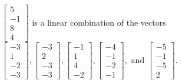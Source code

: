 \begin{exercise}
\begin{exerciseStatement}
  \end{exerciseStatement}
  \begin{exerciseAnswer}
   \(\left[\begin{array}{c}
5 \\
-1 \\
8 \\
4
\end{array}\right]\) 
  	 is  
	a linear combination of the vectors \(\left[\begin{array}{c}
-3 \\
1 \\
-2 \\
-3
\end{array}\right] , \left[\begin{array}{c}
-3 \\
2 \\
-3 \\
-3
\end{array}\right] , \left[\begin{array}{c}
-1 \\
1 \\
4 \\
-2
\end{array}\right] , \left[\begin{array}{c}
-4 \\
-1 \\
-2 \\
-1
\end{array}\right] , \text{ and } \left[\begin{array}{c}
-5 \\
-1 \\
-5 \\
2
\end{array}\right]\).

	
  


  \end{exerciseAnswer}
\end{exercise}